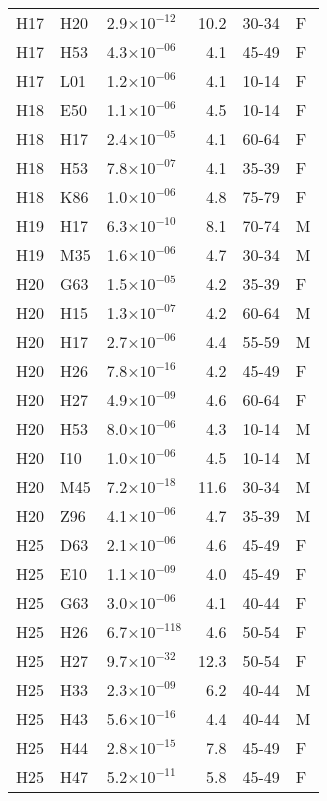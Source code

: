 \begin{longtable}{lllrll}
   H17 & H20 & 2.9$\times10^{-12}$ & 10.2 & 30-34 & F \\ 
   H17 & H53 & 4.3$\times10^{-06}$ & 4.1 & 45-49 & F \\ 
   H17 & L01 & 1.2$\times10^{-06}$ & 4.1 & 10-14 & F \\ 
   H18 & E50 & 1.1$\times10^{-06}$ & 4.5 & 10-14 & F \\ 
   H18 & H17 & 2.4$\times10^{-05}$ & 4.1 & 60-64 & F \\ 
   H18 & H53 & 7.8$\times10^{-07}$ & 4.1 & 35-39 & F \\ 
   H18 & K86 & 1.0$\times10^{-06}$ & 4.8 & 75-79 & F \\ 
   H19 & H17 & 6.3$\times10^{-10}$ & 8.1 & 70-74 & M \\ 
   H19 & M35 & 1.6$\times10^{-06}$ & 4.7 & 30-34 & M \\ 
   H20 & G63 & 1.5$\times10^{-05}$ & 4.2 & 35-39 & F \\ 
   H20 & H15 & 1.3$\times10^{-07}$ & 4.2 & 60-64 & M \\ 
   H20 & H17 & 2.7$\times10^{-06}$ & 4.4 & 55-59 & M \\ 
   H20 & H26 & 7.8$\times10^{-16}$ & 4.2 & 45-49 & F \\ 
   H20 & H27 & 4.9$\times10^{-09}$ & 4.6 & 60-64 & F \\ 
   H20 & H53 & 8.0$\times10^{-06}$ & 4.3 & 10-14 & M \\ 
   H20 & I10 & 1.0$\times10^{-06}$ & 4.5 & 10-14 & M \\ 
   H20 & M45 & 7.2$\times10^{-18}$ & 11.6 & 30-34 & M \\ 
   H20 & Z96 & 4.1$\times10^{-06}$ & 4.7 & 35-39 & M \\ 
   H25 & D63 & 2.1$\times10^{-06}$ & 4.6 & 45-49 & F \\ 
   H25 & E10 & 1.1$\times10^{-09}$ & 4.0 & 45-49 & F \\ 
   H25 & G63 & 3.0$\times10^{-06}$ & 4.1 & 40-44 & F \\ 
   H25 & H26 & 6.7$\times10^{-118}$ & 4.6 & 50-54 & F \\ 
   H25 & H27 & 9.7$\times10^{-32}$ & 12.3 & 50-54 & F \\ 
   H25 & H33 & 2.3$\times10^{-09}$ & 6.2 & 40-44 & M \\ 
   H25 & H43 & 5.6$\times10^{-16}$ & 4.4 & 40-44 & M \\ 
   H25 & H44 & 2.8$\times10^{-15}$ & 7.8 & 45-49 & F \\ 
   H25 & H47 & 5.2$\times10^{-11}$ & 5.8 & 45-49 & F \\ 

\end{longtable}
